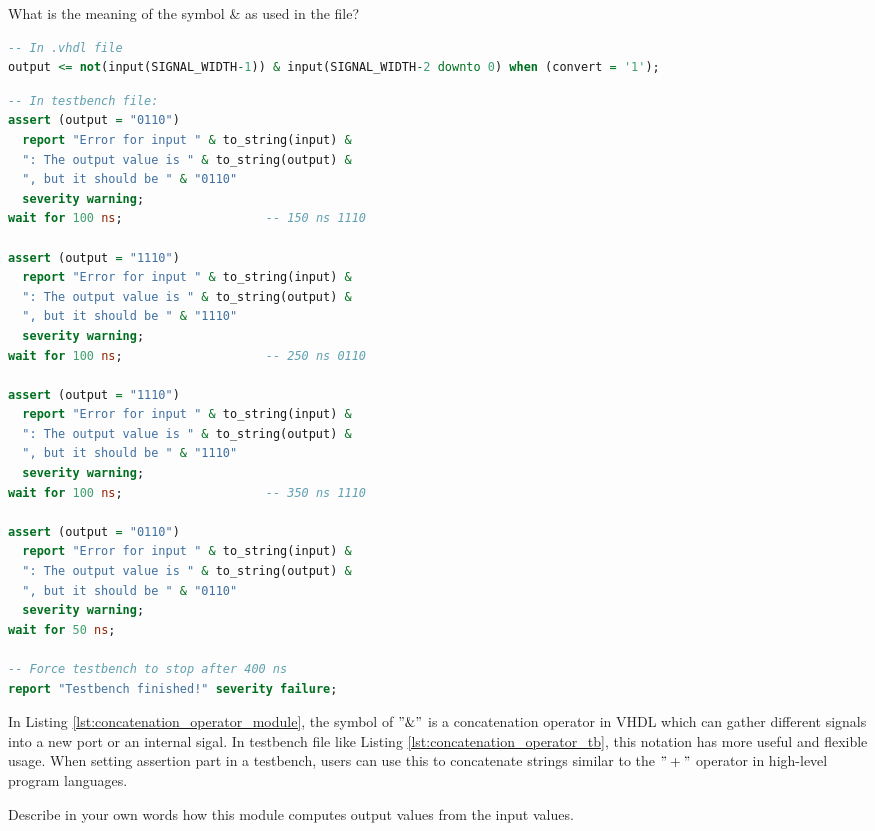 \documentclass[12pt]{article}
\begin{document}
\begin{questionbox}
What is the meaning of the symbol \& as used in the file?
\end{questionbox}

\begin{lstlisting}[caption={ "\&" symbol in "convert\_data\_format.vhdl"}, label={lst:concatenation_operator_module}, language=VHDL]
-- In .vhdl file
output <= not(input(SIGNAL_WIDTH-1)) & input(SIGNAL_WIDTH-2 downto 0) when (convert = '1');
\end{lstlisting}

\begin{lstlisting}[caption={ "\&" symbol in "convert\_data\_format\_tb.vhdl"}, label={lst:concatenation_operator_tb}, language=VHDL]
-- In testbench file:
assert (output = "0110")
  report "Error for input " & to_string(input) &
  ": The output value is " & to_string(output) &
  ", but it should be " & "0110"
  severity warning;
wait for 100 ns;                    -- 150 ns 1110

assert (output = "1110")
  report "Error for input " & to_string(input) &
  ": The output value is " & to_string(output) &
  ", but it should be " & "1110"
  severity warning;
wait for 100 ns;                    -- 250 ns 0110

assert (output = "1110")
  report "Error for input " & to_string(input) &
  ": The output value is " & to_string(output) &
  ", but it should be " & "1110"
  severity warning;
wait for 100 ns;                    -- 350 ns 1110

assert (output = "0110")
  report "Error for input " & to_string(input) &
  ": The output value is " & to_string(output) &
  ", but it should be " & "0110"
  severity warning;
wait for 50 ns;

-- Force testbench to stop after 400 ns
report "Testbench finished!" severity failure;
\end{lstlisting}

In Listing \ref{lst:concatenation_operator_module}, the symbol of \("\&"\) is a concatenation operator in VHDL which can gather different signals into a new port or an internal sigal.
In testbench file like Listing \ref{lst:concatenation_operator_tb}, this notation has more useful and flexible usage.
When setting assertion part in a testbench, users can use this to concatenate strings similar to the \("+"\) operator in high-level program languages.

\begin{questionbox}
Describe in your own words how this module computes output values from the input values.
\end{questionbox}
\end{document}
